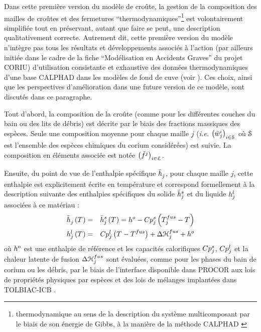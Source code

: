 Dans cette première version du modèle de croûte, la gestion de la composition des mailles de croûtes et des fermetures ``thermodynamiques''\footnote{thermodynamique au sens de la description du système multicomposant par le biais de son énergie de Gibbs, à la manière de la méthode CALPHAD \cite{Lukas2007}} est volontairement simplifiée tout en préservant, autant que faire se peut, une description qualitativement correcte. Autrement dit, cette première version du modèle n'intègre pas tous les résultats et développements associés à l'action (par ailleurs initiée dans le cadre de la fiche ``Modélisation en Accidents Graves'' du projet CORIU) d'utilisation consistante et exhaustive des données thermodynamiques d'une base CALPHAD dans les modèles de fond de cuve (voir \cite{LeTellier2016b,Tiwari2018,LeTellier2019}). Ces choix, ainsi que les perspectives d'amélioration dans une future version de ce modèle, sont discutés dans ce paragraphe.

Tout d'abord, la composition de la croûte (comme pour les différentes couches du bain ou des lits de débris) est décrite par le biais des fractions massiques des espèces. Seule une composition moyenne pour chaque maille $j$  (\textit{i.e.} $\left(\avMassFraction[i]{j}\right)_{i\in \speciesSet}$ où $\speciesSet$ est l'ensemble des espèces chimiques du corium considérées) est suivie. La composition en éléments associée est notée $\left(\elementMassFraction[j]{}\right)_{i\in\elementSet}$.

Ensuite, du point de vue de l'enthalpie spécifique $\avMassEnthalpy{j}$, pour chaque maille $j$, cette enthalpie est explicitement écrite en température et correspond formellement à la description suivante des enthalpies spécifiques du solide $\avMassEnthalpy[s]{j}$ et du liquide $\massEnthalpy[l]{j}$ associées à ce matériau :
\begin{eqnarray}
 \avMassEnthalpy{j} \left(\temperature{}\right) & = & \avMassEnthalpy[s]{j} \left(\temperature{}\right) = \massEnthalpy[o]{} - \heatCp[s]{j} \left(\temperature[fus]{j} - \temperature{}\right) \\
 \massEnthalpy[l]{j} \left(\temperature{}\right) &=& \heatCp[l]{j} \left(\temperature{} - \temperature[fus]{}\right) + \dEnthalpy[fus]{j} + \massEnthalpy[o]{}
\end{eqnarray}
où $\massEnthalpy[o]{}$ est une enthalpie de référence et les capacités calorifiques $\heatCp[s]{j}$, $\heatCp[l]{j}$ et la chaleur latente de fusion $\dEnthalpy[fus]{j}$ sont évaluées, comme pour les phases du bain de corium ou les débris, par le biais de l'interface disponible dans PROCOR aux lois de propriétés physiques par espèces et des lois de mélanges implantées dans TOLBIAC-ICB \cite{Spindler2006}.

